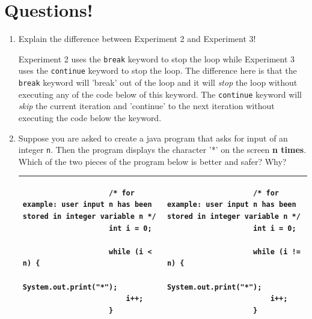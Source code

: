 \documentclass[12pt,titlepage]{article}
\begin{document}
\section{Questions!}
\begin{enumerate}
    \item {
        Explain the difference between Experiment 2 and Experiment 3!

        Experiment 2 uses the \texttt{break} keyword to stop the loop while Experiment 3 uses the \texttt{continue} keyword to stop the loop.
        The difference here is that the \texttt{break} keyword will 'break' out of the loop and it will \textit{stop} the loop without executing any of the code below of this keyword.
        The \texttt{continue} keyword will \textit{skip} the current iteration and 'continue' to the next iteration without executing the code below the keyword.
    }
    \item {
        Suppose you are asked to create a java program that asks for input of an integer \texttt{n}. Then the program displays the character '*' on the screen \textbf{n times}.
        Which of the two pieces of the program below is better and safer? Why?

        \begin{table}[h]
            \centering
            \begin{tabular}{|p{}|p{}|}
                \hline
                \begin{verbatim}
                    /* for example: user input n has been stored in integer variable n */
                    int i = 0;

                    while (i < n) {
                        System.out.print("*");
                        i++;
                    }
                \end{verbatim}
                &
                \begin{verbatim}
                    /* for example: user input n has been stored in integer variable n */
                    int i = 0;

                    while (i != n) {
                        System.out.print("*");
                        i++;
                    }
                \end{verbatim}
                \\
                \hline
            \end{tabular}
        \end{table}

}
\end{enumerate}
\end{document}
